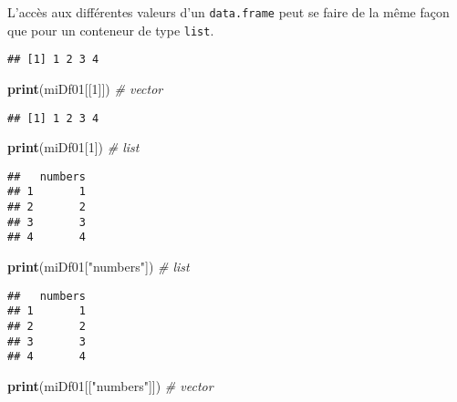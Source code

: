 \documentclass[]{book}
\newenvironment{Shaded}{\begin{snugshade}}{\end{snugshade}}
\newcommand{\KeywordTok}[1]{\textcolor[rgb]{0.13,0.29,0.53}{\textbf{#1}}}
\newcommand{\DecValTok}[1]{\textcolor[rgb]{0.00,0.00,0.81}{#1}}
\newcommand{\StringTok}[1]{\textcolor[rgb]{0.31,0.60,0.02}{#1}}
\newcommand{\CommentTok}[1]{\textcolor[rgb]{0.56,0.35,0.01}{\textit{#1}}}
\newcommand{\OperatorTok}[1]{\textcolor[rgb]{0.81,0.36,0.00}{\textbf{#1}}}
\newcommand{\NormalTok}[1]{#1}
\theoremstyle{definition}
\theoremstyle{definition}
\theoremstyle{definition}
\theoremstyle{remark}
\begin{document}
L'accès aux différentes valeurs d'un \texttt{data.frame} peut se faire
de la même façon que pour un conteneur de type \texttt{list}.

\begin{Shaded}
\end{Shaded}

\begin{verbatim}
## [1] 1 2 3 4
\end{verbatim}

\begin{Shaded}
\begin{Highlighting}[]
\KeywordTok{print}\NormalTok{(miDf01[[}\DecValTok{1}\NormalTok{]]) }\CommentTok{# vector}
\end{Highlighting}
\end{Shaded}

\begin{verbatim}
## [1] 1 2 3 4
\end{verbatim}

\begin{Shaded}
\begin{Highlighting}[]
\KeywordTok{print}\NormalTok{(miDf01[}\DecValTok{1}\NormalTok{]) }\CommentTok{# list}
\end{Highlighting}
\end{Shaded}

\begin{verbatim}
##   numbers
## 1       1
## 2       2
## 3       3
## 4       4
\end{verbatim}

\begin{Shaded}
\begin{Highlighting}[]
\KeywordTok{print}\NormalTok{(miDf01[}\StringTok{"numbers"}\NormalTok{]) }\CommentTok{# list}
\end{Highlighting}
\end{Shaded}

\begin{verbatim}
##   numbers
## 1       1
## 2       2
## 3       3
## 4       4
\end{verbatim}

\begin{Shaded}
\begin{Highlighting}[]
\KeywordTok{print}\NormalTok{(miDf01[[}\StringTok{"numbers"}\NormalTok{]]) }\CommentTok{# vector}
\end{Highlighting}
\end{Shaded}
\end{document}
